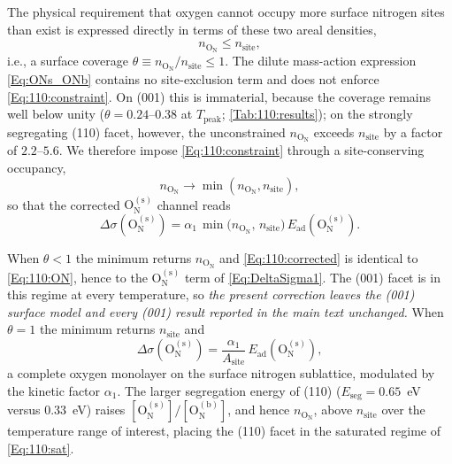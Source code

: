 \documentclass[preprint,12pt,sort&compress]{elsarticle}
\newcommand{\?}{\stackrel{?}{=}}
\begin{document}
The physical requirement that oxygen cannot occupy more surface nitrogen sites than exist is expressed directly in terms of these two areal densities,
\begin{equation}
n_{\text{O}_\text{N}} \le n_\text{site},
\label{Eq:110:constraint}
\end{equation}
i.e., a surface coverage $\theta \equiv n_{\text{O}_\text{N}} / n_\text{site} \le 1$. The dilute mass-action expression \cref{Eq:ONs_ONb} contains no site-exclusion term and does not enforce \cref{Eq:110:constraint}. On (001) this is immaterial, because the coverage remains well below unity ($\theta = 0.24$--$0.38$ at $T_\text{peak}$; \cref{Tab:110:results}); on the strongly segregating (110) facet, however, the unconstrained $n_{\text{O}_\text{N}}$ exceeds $n_\text{site}$ by a factor of $2.2$--$5.6$. We therefore impose \cref{Eq:110:constraint} through a site-conserving occupancy,
\begin{equation}
n_{\text{O}_\text{N}} \to \min( n_{\text{O}_\text{N}}, n_\text{site}),
\end{equation}
so that the corrected $\text{O}_\text{N}^{(\text{s})}$ channel reads
\begin{equation}
\Delta \sigma ( \text{O}_\text{N}^{(\text{s})} ) = \alpha_1 \, \min \! \bigl( n_{\text{O}_\text{N}},\,n_\text{site} \bigr) \,
E_\text{ad}(\text{O}_\text{N}^{(\text{s})}).
\label{Eq:110:corrected}
\end{equation}

When $\theta < 1$ the minimum returns $n_{\text{O}_\text{N}}$ and \cref{Eq:110:corrected} is identical to \cref{Eq:110:ON}, hence to the $\text{O}_\text{N}^{(\text{s})}$ term of \cref{Eq:DeltaSigma1}. The (001) facet is in this regime at every temperature, so \emph{the present correction leaves the (001) surface model and every (001) result reported in the main text unchanged.} When $\theta=1$ the minimum returns $n_\text{site}$ and
\begin{equation}
\Delta \sigma(\text{O}_\text{N}^{(\text{s})}) = \frac{\alpha_1}{A_\text{site}} \, E_\text{ad}(\text{O}_\text{N}^{(\text{s})}),
\label{Eq:110:sat}
\end{equation}
a complete oxygen monolayer on the surface nitrogen sublattice, modulated by the kinetic factor $\alpha_1$. The larger segregation energy of (110) ($E_\text{seg}=0.65$~eV versus $0.33$~eV) raises $[\text{O}_\text{N}^{(\text{s})}]/[\text{O}_\text{N}^{(\text{b})}]$, and hence $n_{\text{O}_\text{N}}$, above $n_\text{site}$ over the temperature range of interest, placing the (110) facet in the saturated regime of \cref{Eq:110:sat}.
\end{document}
